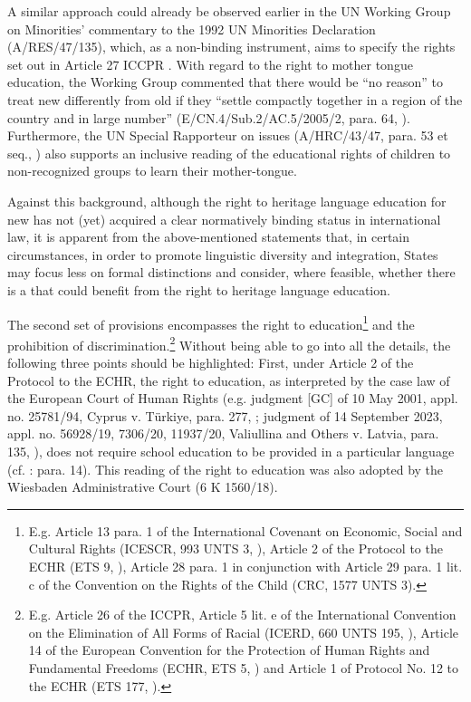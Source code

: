 \documentclass[output=paper,colorlinks,citecolor=brown]{langscibook}
\begin{document}
A similar approach could already be observed earlier in the UN Working Group on Minorities' commentary to the 1992 UN Minorities Declaration (A/{\allowbreak}RES/{\allowbreak}47/{\allowbreak}135), which, as a non-binding instrument, aims to specify the rights set out in Article 27 ICCPR \citep[875]{hofmann_malkmus2023a}. With regard to the right to mother tongue education, the Working Group commented that there would be ``no reason'' to treat new  differently from old  if they ``settle compactly together in a region of the country and in large number'' (E/CN.4/{\allowbreak}Sub.2/{\allowbreak}AC.5/{\allowbreak}2005/2, para. 64, \citealt{wgm2005}). Furthermore, the UN Special Rapporteur on  issues (A/HRC/43/47, para. 53 et seq., \citealt{unsr2020}) also supports an inclusive reading of the educational rights of children  to non-recognized  groups to learn their mother-tongue.

Against this background, although the right to heritage language education for new  has not (yet) acquired a clear normatively binding status in international  law, it is apparent from the above-mentioned statements that, in certain circumstances, in order to promote linguistic diversity and integration, States may focus less on formal distinctions and consider, where feasible, whether there is a  that could benefit from the right to heritage language education.

The second set of provisions encompasses the right to education\footnote{%
E.g. Article 13 para. 1 of the International Covenant on Economic, Social and Cultural Rights (ICESCR, 993 UNTS 3, \citealt{un_icescr_1976}), Article 2 of the Protocol to the ECHR (ETS 9, \citealt{coe1952}), Article 28 para. 1 in conjunction with Article 29 para. 1 lit. c of the Convention on the Rights of the Child (CRC, 1577 UNTS 3).} and the prohibition of discrimination.\footnote{%
E.g. Article 26 of the ICCPR, Article 5 lit. e of the International Convention on the Elimination of All Forms of Racial  (ICERD, 660 UNTS 195, \citealt{un_icerd_1965}), Article 14 of the European Convention for the Protection of Human Rights and Fundamental Freedoms (ECHR, ETS 5, \citealt{coe1950}) and Article 1 of Protocol No. 12 to the ECHR (ETS 177, \citealt{coe2000}).} Without being able to go into all the details, the following three points should be highlighted: First, under Article 2 of the Protocol to the ECHR, the right to education, as interpreted by the case law of the European Court of Human Rights (e.g. judgment [GC] of 10 May 2001, appl. no. 25781/94, Cyprus v. Türkiye, para. 277, \citealt{echr2010}; judgment of 14 September 2023, appl. no. 56928/19, 7306/20, 11937/20, Valiullina and Others v. Latvia, para. 135, \citealt{echr2023}), does not require school education to be provided in a particular language (cf. \citealt{bitter2022}: para. 14). This reading of the right to education was also adopted by the Wiesbaden Administrative Court (6 K 1560/18).
\end{document}
